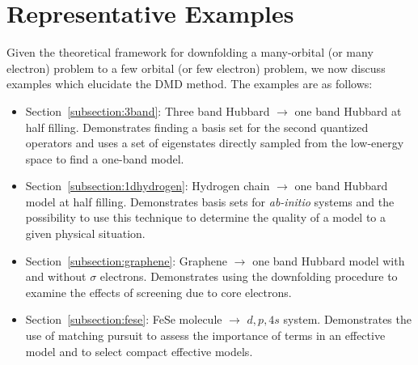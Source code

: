 \section{Representative Examples}

Given the theoretical framework for downfolding a many-orbital (or many electron) problem to a 
few orbital (or few electron) problem, we now discuss examples which elucidate the DMD method. 
The examples are as follows:
\begin{itemize}
\item Section~\ref{subsection:3band}: Three band Hubbard $\rightarrow$ one band Hubbard at half filling. Demonstrates finding a basis set for the second quantized operators and uses a set of eigenstates directly sampled from the low-energy space to find a one-band model.
\item Section~\ref{subsection:1dhydrogen}: Hydrogen chain $\rightarrow$ one band Hubbard model at half filling. Demonstrates basis sets for {\it ab-initio} systems and the possibility to use this technique to determine the quality of a model to a given physical situation.
\item Section~\ref{subsection:graphene}: Graphene $\rightarrow$ one band Hubbard model with and without $\sigma$ electrons. Demonstrates using the downfolding procedure to examine the effects of screening due to core electrons. 
\item Section~\ref{subsection:fese}: FeSe molecule $\rightarrow$ $d,p,4s$ system. Demonstrates the use of matching pursuit to assess the importance of terms in an effective model and to select compact effective models.
\end{itemize}

